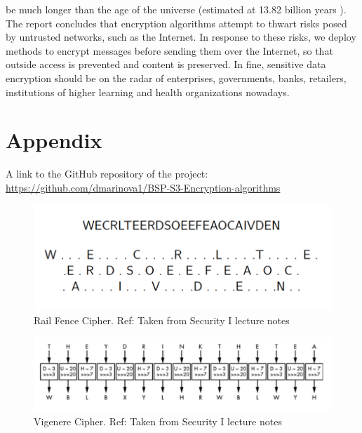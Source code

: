 be much longer than the age of the universe (estimated at 13.82 billion years \cite{universe}). The report concludes that encryption algorithms attempt to thwart risks posed by untrusted networks, such as the Internet. In response to these risks, we deploy methods to encrypt messages before sending them over the Internet, so that outside access is prevented and content is preserved. In fine, sensitive data encryption should be on the radar of enterprises, governments, banks, retailers, institutions of higher learning and health organizations nowadays.


\newpage 
\section{Appendix}
A link to the GitHub repository of the project: \url{https://github.com/dmarinova1/BSP-S3-Encryption-algorithms}

\begin{figure}[h!]
  \includegraphics[width=\linewidth]{railfence.jpg}
  \caption{Rail Fence Cipher. Ref: Taken from Security I lecture notes}
  \label{fig:railfence}
\end{figure}

\begin{figure}[h!]
  \includegraphics[width=\linewidth]{vigenere.jpg}
  \caption{Vigenere Cipher. Ref: Taken from Security I lecture notes}
  \label{fig:vigenere}
\end{figure}

